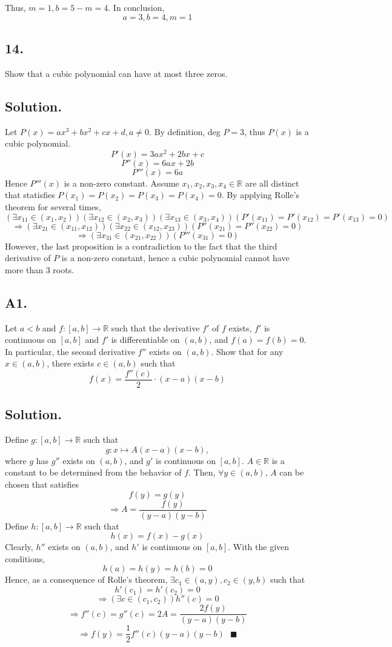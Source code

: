 \documentclass{article}
\begin{document}
Thus, $m=1,b=5-m=4$. In conclusion,
\[a=3,b=4,m=1\]
\subsection*{14.}
Show that a cubic polynomial can have at most three zeros.
\subsection*{Solution.}
Let $P(x)=ax^3+bx^2+cx+d,a\neq 0$. By definition, deg $P=3$, thus $P(x)$ is a cubic polynomial.
\[P'(x)=3ax^2+2bx+c\]
\[P''(x)=6ax+2b\]
\[P'''(x)=6a\]
Hence $P'''(x)$ is a non-zero constant.
Assume $x_1,x_2,x_3,x_4\in \mathbb{R}$ are all distinct that statisfies $P(x_1)=P(x_2)=P(x_3)=P(x_4)=0$.\newline
By applying Rolle's theorem for several times,
\[(\exists x_{11}\in(x_1,x_2))(\exists x_{12}\in(x_2,x_3))(\exists x_{13}\in(x_3,x_4))(P'(x_{11})=P'(x_{12})=P'(x_{13})=0)\]
\[\Rightarrow(\exists x_{21}\in(x_{11},x_{12}))(\exists x_{22}\in(x_{12},x_{23}))(P''(x_{21})=P''(x_{22})=0)\]
\[\Rightarrow(\exists x_{31}\in(x_{21},x_{22}))(P'''(x_{31})=0)\]
However, the last proposition is a contradiction to the fact that the third derivative of $P$ is a non-zero constant, hence a cubic polynomial cannot have more than 3 roots.
\subsection*{A1.}
Let $a<b$ and $f:[a,b]\to\mathbb{R}$ such that the derivative $f'$ of $f$ exists, $f'$ is continuous on $[a,b]$ and $f'$ is differentiable on $(a,b)$, and $f(a)=f(b)=0$. In particular, the second derivative $f''$ exists on $(a,b)$. Show that for any $x\in(a,b)$, there exists $c\in(a,b)$ such that 
\[f(x)=\frac{f''(c)}{2}\cdot (x-a)(x-b)\]
\subsection*{Solution.}
Define $g:[a,b]\to\mathbb{R}$ such that 
\[g:x\mapsto A(x-a)(x-b),\]
where $g$ has $g''$ exists on $(a,b)$, and $g'$ is continuous on $[a,b]$. $A\in\mathbb{R}$ is a constant to be determined from the behavior of $f$.\newline
Then, $\forall y\in (a,b)$,  $A$ can be chosen that satisfies 
\[f(y)=g(y)\]
\[\Rightarrow A=\frac{f(y)}{(y-a)(y-b)}\]
Define $h:[a,b]\to \mathbb{R}$ such that
\[h(x)=f(x)-g(x)\]
Clearly, $h''$ exists on $(a,b)$, and $h'$ is continuous on $[a,b]$. With the given conditions,
\[h(a)=h(y)=h(b)=0\]
Hence, as a consequence of Rolle's theorem, $\exists c_1\in (a,y), c_2\in (y,b)$ such that
\[h'(c_1)=h'(c_2)=0\]
\[\Rightarrow (\exists c\in(c_1,c_2))h''(c)=0\]
\[\Rightarrow f''(c)=g''(c)=2A=\frac{2f(y)}{(y-a)(y-b)}\]
\[\Rightarrow f(y)=\frac{1}{2}f''(c)(y-a)(y-b)\text{    }\blacksquare\]
\end{document}
